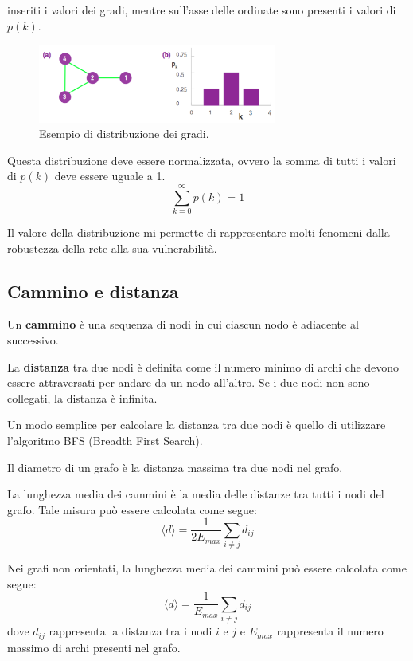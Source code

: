 inseriti i valori dei gradi, mentre sull'asse delle ordinate sono presenti i
valori di $p(k)$.
\begin{figure}[!ht]
    \centering
    \includegraphics[width=0.7\textwidth]{./img/net/degreedist.png}
    \caption{Esempio di distribuzione dei gradi.}
    \label{fig:degree_distribution}
\end{figure}
\begin{nota}
    Questa distribuzione deve essere normalizzata, ovvero la somma di tutti i
    valori di $p(k)$ deve essere uguale a 1.
    \begin{equation*}
        \sum_{k=0}^{\infty} p(k) = 1
    \end{equation*}
\end{nota}

Il valore della distribuzione mi permette di rappresentare molti fenomeni dalla
robustezza della rete alla sua vulnerabilità.
\subsection{Cammino e distanza}
\begin{definizione}
    Un \textbf{cammino} è una sequenza di nodi in cui ciascun nodo è adiacente
    al successivo.
\end{definizione}
\begin{definizione}
    La \textbf{distanza} tra due nodi è definita come il numero minimo di archi
    che devono essere attraversati per andare da un nodo all'altro. Se i due
    nodi non sono collegati, la distanza è infinita.
\end{definizione}
Un modo semplice per calcolare la distanza tra due nodi è quello di utilizzare
l'algoritmo BFS (Breadth First Search).
\begin{definizione}
    Il diametro di un grafo è la distanza massima tra due nodi nel grafo.
\end{definizione}
\begin{definizione}
    La lunghezza media dei cammini è la media delle distanze tra tutti i nodi
    del grafo. Tale misura può essere calcolata come segue:
    \begin{equation}
        \langle d \rangle = \frac{1}{2E_{max}} \sum_{i \neq j} d_{ij}
    \end{equation}
\end{definizione}
Nei grafi non orientati, la lunghezza media dei cammini può essere calcolata
come segue:
\begin{equation}
    \langle d \rangle = \frac{1}{E_{max}} \sum_{i \neq j} d_{ij}
\end{equation}
dove $d_{ij}$ rappresenta la distanza tra i nodi $i$ e $j$ e $E_{max}$ rappresenta
il numero massimo di archi presenti nel grafo.
